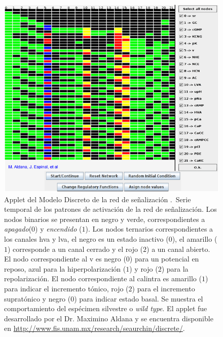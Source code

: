 \begin{figure}[hbt]
\includegraphics[width=0.9\linewidth%
]{gfx/appletErizo}
\caption[Applet del Modelo Discreto]{Applet del Modelo Discreto de la red de se\~nalizaci\'on \citeauthor{Espinal2011} \citep{Espinal2011}.\ Serie temporal de los patrones de activación de la red de señalización. Los nodos binarios se presentan en negro y verde, correspondientes a \emph{apagado}($0$) y \emph{encendido} ($1$). Los nodos ternarios correspondientes a los canales \ac{hva} y \ac{lva}, el negro es un estado inactivo ($0$), el amarillo ($1$) corresponde a un canal cerrado y el rojo ($2$) a un canal abierto. El nodo correspondiente al \acf{v} es negro ($0$) para un potencial en reposo, azul para la hiperpolarización ($1$) y rojo ($2$) para la repolarización. El nodo correspondiente al \ac{calintra} es amarillo ($1$) para indicar el incremento tónico, rojo ($2$) para el incremento supratónico y negro ($0$) para indicar estado basal. Se muestra el comportamiento del espécimen silvestre o \emph{wild type}.
El applet fue desarrollado por el Dr. Maximino Aldana y se encuentra disponible en \url{http://www.fis.unam.mx/research/seaurchin/discrete/}.}\label{fig:appletErizo}
\end{figure}

